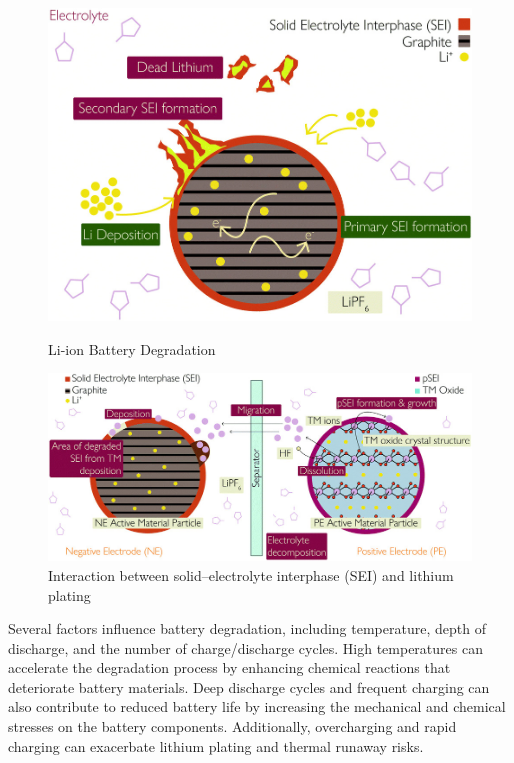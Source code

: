\begin{figure}[h]
    \centering
    \begin{minipage}[b]{0.45\textwidth}
        \centering
        \includegraphics[width=\textwidth]{d1cp00359c-f2_hi-res.jpg}
        \caption{ Li-ion Battery Degradation }
        \label{fig:importance}
    \end{minipage}
    \hspace{0.05\textwidth} %
    \begin{minipage}[b]{0.45\textwidth}
        \centering
        \includegraphics[width=\textwidth]{d1cp00359c-f4_hi-res.jpg} %
        \caption{ Interaction between solid–electrolyte interphase (SEI) and lithium plating }
        \label{fig:another1}
    \end{minipage}
\end{figure}

Several factors influence battery degradation, including temperature, depth of discharge, and the number of charge/discharge cycles. High temperatures can accelerate the degradation process by enhancing chemical reactions that deteriorate battery materials. Deep discharge cycles and frequent charging can also contribute to reduced battery life by increasing the mechanical and chemical stresses on the battery components. Additionally, overcharging and rapid charging can exacerbate lithium plating and thermal runaway risks. 

